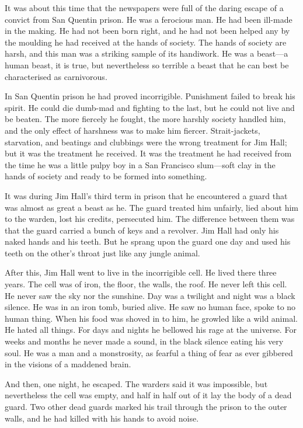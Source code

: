 \documentclass[10pt]{book}
\begin{document}
It was about this time that the newspapers were full of the daring
escape of a convict from San Quentin prison. He was a ferocious man. He
had been ill-made in the making. He had not been born right, and he had
not been helped any by the moulding he had received at the hands of
society. The hands of society are harsh, and this man was a striking
sample of its handiwork. He was a beast—a human beast, it is true, but
nevertheless so terrible a beast that he can best be characterised as
carnivorous.

In San Quentin prison he had proved incorrigible. Punishment failed to
break his spirit. He could die dumb-mad and fighting to the last, but
he could not live and be beaten. The more fiercely he fought, the more
harshly society handled him, and the only effect of harshness was to
make him fiercer. Strait-jackets, starvation, and beatings and
clubbings were the wrong treatment for Jim Hall; but it was the
treatment he received. It was the treatment he had received from the
time he was a little pulpy boy in a San Francisco slum—soft clay in the
hands of society and ready to be formed into something.

It was during Jim Hall’s third term in prison that he encountered a
guard that was almost as great a beast as he. The guard treated him
unfairly, lied about him to the warden, lost his credits, persecuted
him. The difference between them was that the guard carried a bunch of
keys and a revolver. Jim Hall had only his naked hands and his teeth.
But he sprang upon the guard one day and used his teeth on the other’s
throat just like any jungle animal.

After this, Jim Hall went to live in the incorrigible cell. He lived
there three years. The cell was of iron, the floor, the walls, the
roof. He never left this cell. He never saw the sky nor the sunshine.
Day was a twilight and night was a black silence. He was in an iron
tomb, buried alive. He saw no human face, spoke to no human thing. When
his food was shoved in to him, he growled like a wild animal. He hated
all things. For days and nights he bellowed his rage at the universe.
For weeks and months he never made a sound, in the black silence eating
his very soul. He was a man and a monstrosity, as fearful a thing of
fear as ever gibbered in the visions of a maddened brain.

And then, one night, he escaped. The warders said it was impossible,
but nevertheless the cell was empty, and half in half out of it lay the
body of a dead guard. Two other dead guards marked his trail through
the prison to the outer walls, and he had killed with his hands to
avoid noise.
\end{document}
